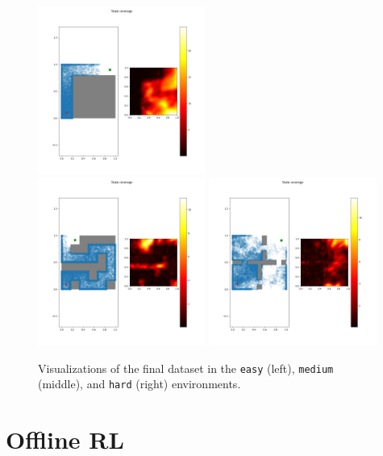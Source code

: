 \documentclass{article}
\begin{document}
\begin{figure}[H]
    \centering
    \includegraphics[width=0.49\textwidth]{../report/assets/PointmassEasy-v0_rnd1.0.png}~
    \includegraphics[width=0.49\textwidth]{../report/assets/PointmassMedium-v0_rnd1.0.png}
    \includegraphics[width=0.49\textwidth]{../report/assets/PointmassHard-v0_rnd1.0.png}
    \caption{Visualizations of the final dataset in the \texttt{easy} (left), \texttt{medium} (middle), and \texttt{hard} (right) environments.}
\end{figure}

\section{Offline RL}
\end{document}
